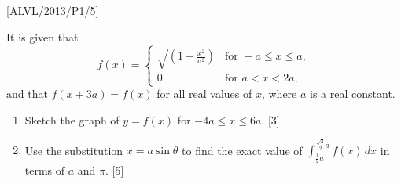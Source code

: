 \item {[}ALVL/2013/P1/5{]}

It is given that 
\[
f\left(x\right)=\begin{cases}
\sqrt{\left(1-\frac{x^{2}}{a^{2}}\right)} & \text{for }-a\leq x\leq a,\\
0 & \text{for }a<x<2a,
\end{cases}
\]
 and that $f\left(x+3a\right)=f\left(x\right)$ for all real values
of $x$, where $a$ is a real constant.
\begin{enumerate}
\item Sketch the graph of $y=f\left(x\right)$ for $-4a\leq x\leq6a$. \hfill{}
{[}3{]}
\item Use the substitution $x=a\sin\theta$ to find the exact value of $\int_{\frac{1}{2}a}^{\frac{\sqrt{3}}{2}a}f\left(x\right)\,dx$
in terms of $a$ and $\pi$. \hfill{}{[}5{]}
\end{enumerate}
